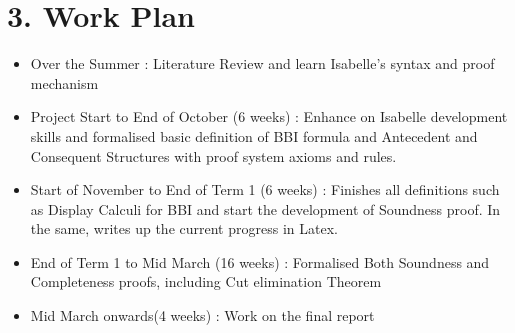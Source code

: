 \documentclass{report}
\begin{document}
\newpage
\section*{3. Work Plan}
\begin{itemize}
	\item Over the Summer : Literature Review and learn Isabelle's syntax and proof mechanism
	\item Project Start to End of October (6 weeks) :  Enhance on Isabelle development skills and formalised basic definition of BBI formula and Antecedent and Consequent Structures with proof system axioms and rules.
	\item Start of November to End of Term 1 (6 weeks) : Finishes all definitions such as Display Calculi for BBI and start the development of Soundness proof. In the same, writes up the current progress in Latex.
	\item End of Term 1 to Mid March (16 weeks) : Formalised Both Soundness and Completeness proofs, including Cut elimination Theorem
	\item Mid March onwards(4 weeks) : Work on the final report
\end{itemize}
\end{document}

